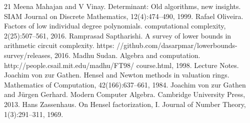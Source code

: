 \begin{thebibliography}{21}
Meena Mahajan and V Vinay. Determinant: Old algorithms, new insights. SIAM Journal on Discrete Mathematics, 12(4):474–490, 1999.
Rafael Oliveira. Factors of low individual degree polynomials. computational complexity, 2(25):507–561, 2016.
Ramprasad Saptharishi. A survey of lower bounds in arithmetic circuit complexity. https: //github.com/dasarpmar/lowerbounds-survey/releases, 2016.
Madhu Sudan. Algebra and computation. http://people.csail.mit.edu/madhu/FT98/ course.html, 1998. Lecture Notes.
Joachim von zur Gathen. Hensel and Newton methods in valuation rings. Mathematics of Computation, 42(166):637–661, 1984.
Joachim von zur Gathen and Jürgen Gerhard. Modern Computer Algebra. Cambridge University Press, 2013.
Hans Zassenhaus. On Hensel factorization, I. Journal of Number Theory, 1(3):291–311, 1969.
\end{thebibliography}

